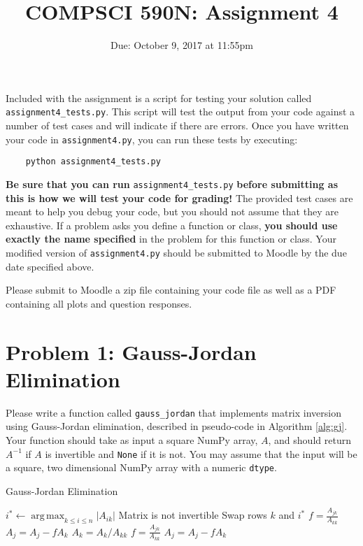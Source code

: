\documentclass[11pt]{article} %
\title{COMPSCI 590N: Assignment 4}
\date{Due: October 9, 2017 at 11:55pm}
\DeclareMathOperator*{\argmax}{arg\,max}
\begin{document}
\thispagestyle{empty}
\pagestyle{empty}

\maketitle
Included with the assignment is a script for testing your solution called \verb|assignment4_tests.py|. This script will test the output from your code against a number of test cases and will indicate if there are errors. Once you have written your code in \verb|assignment4.py|, you can run these tests by executing:

\begin{verbatim}
	python assignment4_tests.py
\end{verbatim}

\textbf{Be sure that you can run} \verb|assignment4_tests.py| \textbf{before submitting as this is how we will test your code for grading!} The provided test cases are meant to help you debug your code, but you should not assume that they are exhaustive. If a problem asks you define a function or class, \textbf{you should use exactly the name specified} in the problem for this function or class. Your modified version of \verb|assignment4.py| should be submitted to Moodle by the due date specified above. 

Please submit to Moodle a zip file containing your code file as well as a PDF containing all plots and question responses.

\section{Problem 1: Gauss-Jordan Elimination}
Please write a function called \verb|gauss_jordan| that implements matrix inversion using Gauss-Jordan elimination, described in pseudo-code in Algorithm \ref{alg:gj}. Your function should take as input a square NumPy array, $A$, and should return $A^{-1}$ if $A$ is invertible and \verb|None| if it is not. You may assume that the input will be a square, two dimensional NumPy array with a numeric \verb|dtype|.

\begin{algorithm}[h!]
	\caption{Gauss-Jordan Elimination}
	\label{alg:gj}
	\begin{algorithmic}
		\STATE $i^* \leftarrow \argmax_{k \leq i \leq n} |A_{ik}|$
		\STATE Matrix is not invertible
		\ENDIF
		\STATE Swap rows $k$ and $i^*$ 
		\STATE $f = \frac{A_{jk}}{A_{kk}}$
		\STATE $A_{j} = A_{j} - fA_{k}$
		\ENDFOR
		\ENDFOR
		\STATE $A_k = A_k/A_{kk}$
		\STATE $f = \frac{A_{jk}}{A_{kk}}$
		\STATE $A_{j} = A_{j} - fA_{k}$
		\ENDFOR
		\ENDFOR
	\end{algorithmic}
\end{algorithm}
\end{document}
